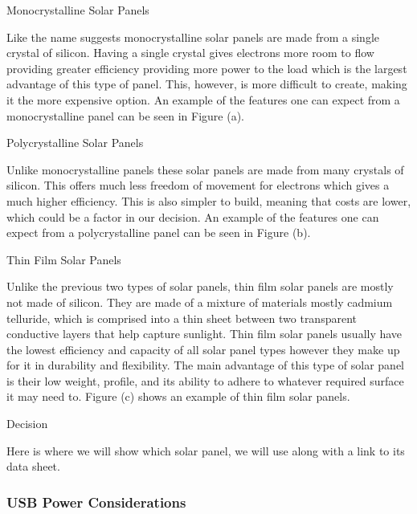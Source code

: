 Monocrystalline Solar Panels 

Like the name suggests monocrystalline solar panels are made from a single crystal of silicon. Having a single crystal gives electrons more room to flow providing greater efficiency providing more power to the load which is the largest advantage of this type of panel. This, however, is more difficult to create, making it the more expensive option. An example of the features one can expect from a monocrystalline panel can be seen in Figure (a). 

Polycrystalline Solar Panels 

Unlike monocrystalline panels these solar panels are made from many crystals of silicon. This offers much less freedom of movement for electrons which gives a much higher efficiency. This is also simpler to build, meaning that costs are lower, which could be a factor in our decision. An example of the features one can expect from a polycrystalline panel can be seen in Figure (b). 

Thin Film Solar Panels 

Unlike the previous two types of solar panels, thin film solar panels are mostly not made of silicon. They are made of a mixture of materials mostly cadmium telluride, which is comprised into a thin sheet between two transparent conductive layers that help capture sunlight. Thin film solar panels usually have the lowest efficiency and capacity of all solar panel types however they make up for it in durability and flexibility. The main advantage of this type of solar panel is their low weight, profile, and its ability to adhere to whatever required surface it may need to. Figure (c) shows an example of thin film solar panels. 

Decision 

Here is where we will show which solar panel, we will use along with a link to its data sheet. 
\subsubsection{USB Power Considerations}
